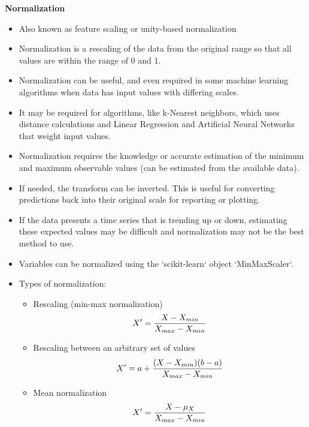 \documentclass[11pt]{article}
\begin{document}
    \textbf{Normalization}
    \begin{itemize}
        \item Also known as feature scaling or unity-based normalization
        \item Normalization is a rescaling of the data from the original range so that all values are within the range of 0 and 1.
        \item Normalization can be useful, and even required in some machine learning algorithms when data has input values with differing scales.
        \item It may be required for algorithms, like k-Nearest neighbors, which uses distance calculations and Linear Regression and Artificial Neural Networks that weight input values.
        \item Normalization requires the knowledge or accurate estimation of the minimum and maximum observable values (can be estimated from the available data).
        \item If needed, the transform can be inverted.
        This is useful for converting predictions back into their original scale for reporting or plotting.
        \item If the data presents a time series that is trending up or down, estimating these expected values may be difficult and normalization may not be the best method to use.
        \item Variables can be normalized using the `scikit-learn` object `MinMaxScaler`.
        \item Types of normalization:
        \begin{itemize}
            \item Rescaling (min-max normalization)
            \begin{equation} \label{eq:normalization_rescaling}
            \large{ X' = \frac{ X - X_{min} } { X_{max} - X_{min} } }
            \end{equation}
            \item Rescaling between an arbitrary set of values
            \begin{equation} \label{eq:normalization_rescaling_between_set}
            \large{ X' = a + \frac{ (X - X_{min})(b - a) } { X_{max} - X_{min} } }
            \end{equation}
            \item Mean normalization
            \begin{equation} \label{eq:normalization_mean}
            \large{ X' = \frac{ X - \mu_X } { X_{max} - X_{min} } }
            \end{equation}
        \end{itemize}
    \end{itemize}
\end{document}
